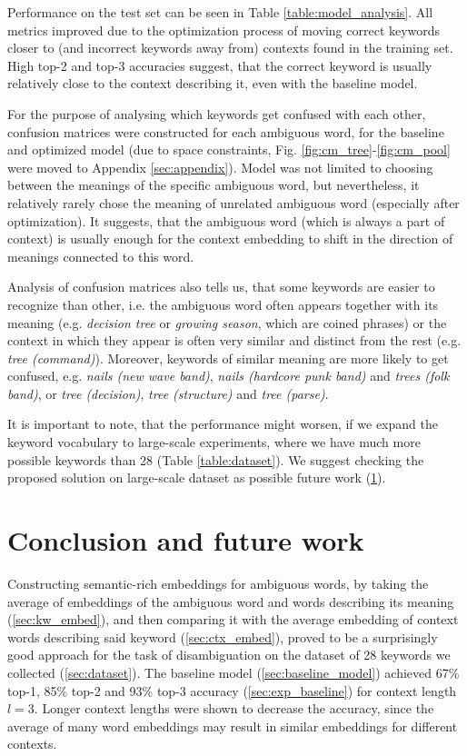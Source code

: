 \documentclass{llncs}
\begin{document}
Performance on the test set can be seen in Table \ref{table:model_analysis}.
All metrics improved due to the optimization process of moving correct keywords closer to (and incorrect keywords away from) contexts found in the training set.
High top-2 and top-3 accuracies suggest, that the correct keyword is usually relatively close to the context describing it, even with the baseline model.

For the purpose of analysing which keywords get confused with each other, confusion matrices were constructed for each ambiguous word, for the baseline and optimized model (due to space constraints, Fig. \ref{fig:cm_tree}-\ref{fig:cm_pool} were moved to Appendix \ref{sec:appendix}).
Model was not limited to choosing between the meanings of the specific ambiguous word, but nevertheless, it relatively rarely chose the meaning of unrelated ambiguous word (especially after optimization).
It suggests, that the ambiguous word (which is always a part of context) is usually enough for the context embedding to shift in the direction of meanings connected to this word.

Analysis of confusion matrices also tells us, that some keywords are easier to recognize than other, i.e. the ambiguous word often appears together with its meaning (e.g. \textit{decision tree} or \textit{growing season}, which are coined phrases) or the context in which they appear is often very similar and distinct from the rest (e.g. \textit{tree (command)}).
Moreover, keywords of similar meaning are more likely to get confused, e.g. \textit{nails (new wave band)}, \textit{nails (hardcore punk band)} and \textit{trees (folk band)}, or \textit{tree (decision)}, \textit{tree (structure)} and \textit{tree (parse)}.

It is important to note, that the performance might worsen, if we expand the keyword vocabulary to large-scale experiments, where we have much more possible keywords than 28 (Table \ref{table:dataset}).
We suggest checking the proposed solution on large-scale dataset as possible future work (\ref{sec:conclusion}).


\section{Conclusion and future work}
\label{sec:conclusion}
Constructing semantic-rich embeddings for ambiguous words, by taking the average of embeddings of the ambiguous word and words describing its meaning (\ref{sec:kw_embed}), and then comparing it with the average embedding of context words describing said keyword (\ref{sec:ctx_embed}), proved to be a surprisingly good approach for the task of disambiguation on the dataset of 28 keywords we collected (\ref{sec:dataset}).
The baseline model (\ref{sec:baseline_model}) achieved 67\% top-1, 85\% top-2 and 93\% top-3 accuracy (\ref{sec:exp_baseline}) for context length \(l=3\). Longer context lengths were shown to decrease the accuracy, since the average of many word embeddings may result in similar embeddings for different contexts.
\end{document}
